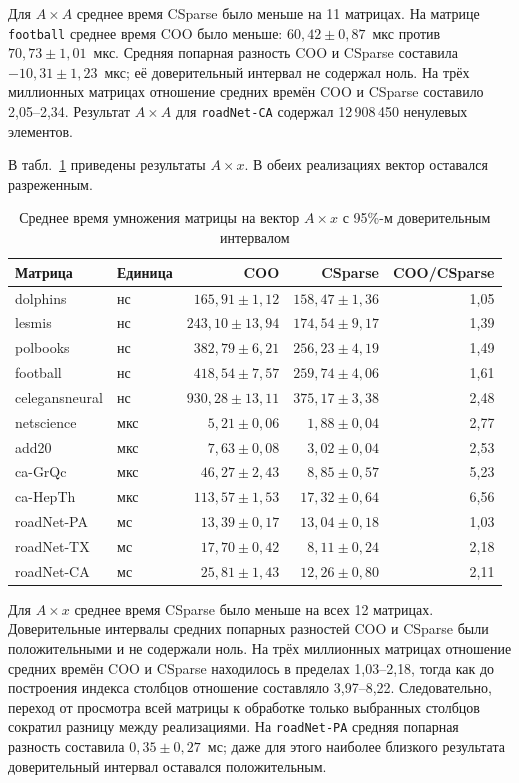 \documentclass[a4paper]{article}
\begin{document}
Для $A\times A$ среднее время CSparse было меньше на 11 матрицах. На матрице \texttt{football} среднее время COO было меньше: $60{,}42 \pm 0{,}87$~мкс против $70{,}73 \pm 1{,}01$~мкс. Средняя попарная разность COO и CSparse составила $-10{,}31 \pm 1{,}23$~мкс; её доверительный интервал не содержал ноль. На трёх миллионных матрицах отношение средних времён COO и CSparse составило 2{,}05--2{,}34. Результат $A\times A$ для \texttt{roadNet-CA} содержал 12\,908\,450 ненулевых элементов.

В табл.~\ref{tab:mv} приведены результаты $A\times x$. В обеих реализациях вектор оставался разреженным.
\begin{table}[H]
\centering\scriptsize
\caption{Среднее время умножения матрицы на вектор $A\times x$ с 95\%-м доверительным интервалом}
\label{tab:mv}
\begin{tabular}{llrrr}
\toprule
Матрица & Единица & COO & CSparse & COO/CSparse\\
\midrule
dolphins & нс & $165{,}91 \pm 1{,}12$ & $158{,}47 \pm 1{,}36$ & 1{,}05\\
lesmis & нс & $243{,}10 \pm 13{,}94$ & $174{,}54 \pm 9{,}17$ & 1{,}39\\
polbooks & нс & $382{,}79 \pm 6{,}21$ & $256{,}23 \pm 4{,}19$ & 1{,}49\\
football & нс & $418{,}54 \pm 7{,}57$ & $259{,}74 \pm 4{,}06$ & 1{,}61\\
celegansneural & нс & $930{,}28 \pm 13{,}11$ & $375{,}17 \pm 3{,}38$ & 2{,}48\\
netscience & мкс & $5{,}21 \pm 0{,}06$ & $1{,}88 \pm 0{,}04$ & 2{,}77\\
add20 & мкс & $7{,}63 \pm 0{,}08$ & $3{,}02 \pm 0{,}04$ & 2{,}53\\
ca-GrQc & мкс & $46{,}27 \pm 2{,}43$ & $8{,}85 \pm 0{,}57$ & 5{,}23\\
ca-HepTh & мкс & $113{,}57 \pm 1{,}53$ & $17{,}32 \pm 0{,}64$ & 6{,}56\\
roadNet-PA & мс & $13{,}39 \pm 0{,}17$ & $13{,}04 \pm 0{,}18$ & 1{,}03\\
roadNet-TX & мс & $17{,}70 \pm 0{,}42$ & $8{,}11 \pm 0{,}24$ & 2{,}18\\
roadNet-CA & мс & $25{,}81 \pm 1{,}43$ & $12{,}26 \pm 0{,}80$ & 2{,}11\\
\bottomrule
\end{tabular}
\end{table}

Для $A\times x$ среднее время CSparse было меньше на всех 12 матрицах. Доверительные интервалы средних попарных разностей COO и CSparse были положительными и не содержали ноль. На трёх миллионных матрицах отношение средних времён COO и CSparse находилось в пределах 1{,}03--2{,}18, тогда как до построения индекса столбцов отношение составляло 3{,}97--8{,}22. Следовательно, переход от просмотра всей матрицы к обработке только выбранных столбцов сократил разницу между реализациями. На \texttt{roadNet-PA} средняя попарная разность составила $0{,}35 \pm 0{,}27$~мс; даже для этого наиболее близкого результата доверительный интервал оставался положительным.
\end{document}
